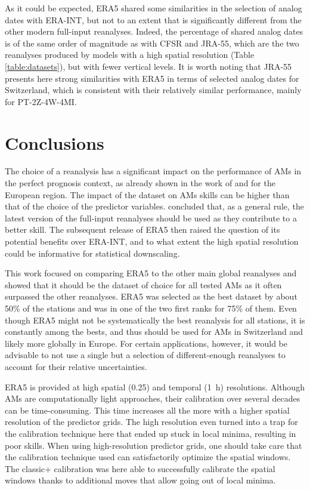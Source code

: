 \documentclass[alpha-refs]{wiley-article}
\begin{document}
As it could be expected, ERA5 shared some similarities in the selection of analog dates with ERA-INT, but not to an extent that is significantly different from the other modern full-input reanalyses. Indeed, the percentage of shared analog dates is of the same order of magnitude as with CFSR and JRA-55, which are the two reanalyses produced by models with a high spatial resolution (Table \ref{table:datasets}), but with fewer vertical levels. It is worth noting that JRA-55 presents here strong similarities with ERA5 in terms of selected analog dates for Switzerland, which is consistent with their relatively similar performance, mainly for PT-2Z-4W-4MI.


\section{Conclusions}
\label{sec:conclusion}

The choice of a reanalysis has a significant impact on the performance of AMs in the perfect prognosis context, as already shown in the work of \citet{Dayon2015} and \citet{Horton2018b} for the European region. The impact of the dataset on AMs skills can be higher than that of the choice of the predictor variables. \citet{Horton2018b} concluded that, as a general rule, the latest version of the full-input reanalyses should be used as they contribute to a better skill. The subsequent release of ERA5 then raised the question of its potential benefits over ERA-INT, and to what extent the high spatial resolution could be informative for statistical downscaling.

This work focused on comparing ERA5 to the other main global reanalyses and showed that it should be the dataset of choice for all tested AMs as it often surpassed the other reanalyses. ERA5 was selected as the best dataset by about 50\% of the stations and was in one of the two first ranks for 75\% of them. Even though ERA5 might not be systematically the best reanalysis for all stations, it is constantly among the bests, and thus should be used for AMs in Switzerland and likely more globally in Europe. For certain applications, however, it would be advisable to not use a single but a selection of different-enough reanalyses to account for their relative uncertainties.

ERA5 is provided at high spatial (0.25\degree) and temporal (1~h) resolutions. Although AMs are computationally light approaches, their calibration over several decades can be time-consuming. This time increases all the more with a higher spatial resolution of the predictor grids. The high resolution even turned into a trap for the calibration technique here that ended up stuck in local minima, resulting in poor skills. When using high-resolution predictor grids, one should take care that the calibration technique used can satisfactorily optimize the spatial windows. The classic+ calibration \citep{Horton2019} was here able to successfully calibrate the spatial windows thanks to additional moves that allow going out of local minima.
\end{document}
